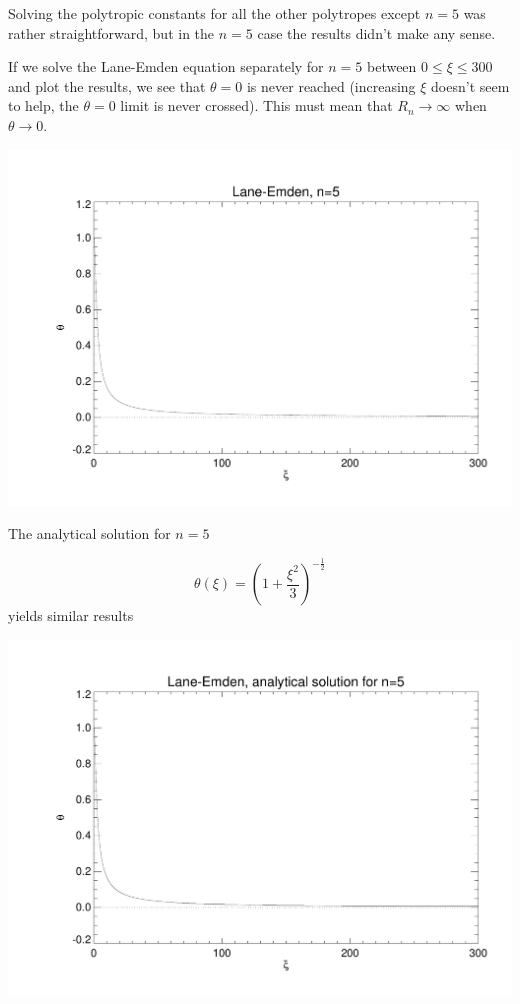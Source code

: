 \documentclass[a4paper,12pt]{article}
\begin{document}
\begin{itemize}
\vspace{0.5cm}
Solving the polytropic constants for all the other polytropes except $n=5$ was rather straightforward, but in the $n=5$ case the results didn't make any sense.

If we solve the Lane-Emden equation separately for $n=5$ between $0 \leq \xi \leq 300$ and plot the results, we see that $\theta = 0$ is never reached (increasing $\xi$ doesn't seem to help, the $\theta = 0$ limit is never crossed). This must mean that $R_n \to \infty$ when $\theta \to 0$.

\centerline{\includegraphics[scale=0.6]{stellar_poly5.pdf}}
\vspace*{0.5cm}

The analytical solution for $n=5$

\begin{equation}
\theta(\xi) = (1+ \frac{ \xi^2}{3})^{-\frac{1}{2}} 
\end{equation}
yields similar results

\centerline{\includegraphics[scale=0.6]{analytical5.pdf}}


\end{itemize}
\end{document}
